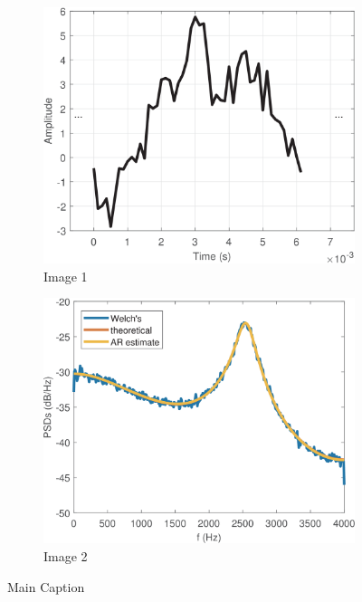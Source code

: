 \documentclass{article}
\begin{document}
\begin{figure}[htpb]
    \centering
    \begin{subfigure}{0.45\textwidth}
      \centering
      \includegraphics[width=\textwidth]{figures/analogsignal.png}
      \caption{Image 1}
    \end{subfigure}
    \begin{subfigure}{0.45\textwidth}
      \centering
      \includegraphics[width=\textwidth]{figures/arSpectrumMatched.png}
      \caption{Image 2}
    \end{subfigure}
    \caption{Main Caption}
  \end{figure}
\end{document}

